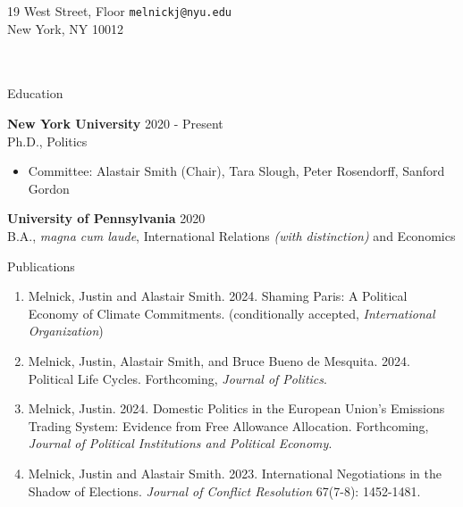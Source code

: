 \documentclass{resume} %
\begin{document}
19 West  Street,  Floor \hfill \texttt{melnickj@nyu.edu}\\
New York, NY 10012 \hfill \texttt{\href{justinmelnick.github.io}{}} \\\\\\
\begin{rSection}{Education}

{\bf New York University} \hfill { 2020 - Present} \\
Ph.D., Politics 
\begin{itemize}
    \item Committee: Alastair Smith (Chair), Tara Slough, Peter Rosendorff, Sanford Gordon
\end{itemize}
\vspace*{0.075in}

{\bf University of Pennsylvania} \hfill { 2020} 
\\B.A., \emph{magna cum laude}, International Relations \emph{(with distinction)} and Economics


\end{rSection}

\begin{rSection}{Publications}

\begin{enumerate}
           \item Melnick, Justin and Alastair Smith. 2024. Shaming Paris: A Political Economy of Climate Commitments. (conditionally accepted, \textit{International Organization})
 \item Melnick, Justin, Alastair Smith, and Bruce Bueno de Mesquita. 2024. Political Life Cycles. Forthcoming, \textit{Journal of Politics}.
\item Melnick, Justin. 2024. Domestic Politics in the European Union’s Emissions Trading System: Evidence from Free Allowance Allocation. Forthcoming, \textit{Journal of Political Institutions and Political Economy}.
    \item Melnick, Justin and Alastair Smith. 2023. International Negotiations in the Shadow of Elections.  \textit{Journal of Conflict Resolution} 67(7-8): 1452-1481.
\end{enumerate}

\end{rSection}
\end{document}
